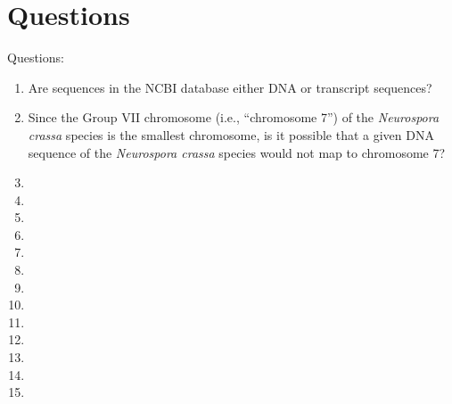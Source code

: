\chapter{Questions}
\label{chp:Questions}



Questions: \vspace{-0.3cm}
\begin{enumerate} \itemsep -4pt
\item Are sequences in the NCBI database either DNA or transcript sequences?
\item Since the Group VII chromosome (i.e., ``chromosome 7'') of the {\it Neurospora crassa} species is the smallest chromosome, is it possible that a given DNA sequence of the {\it Neurospora crassa} species would not map to chromosome 7?
\item 
\item 
\item 
\item 
\item 
\item 
\item 
\item 
\item 
\item 
\item 
\item 
\item 
\end{enumerate}














